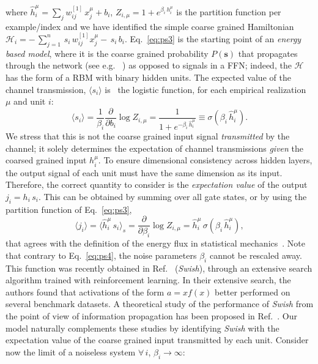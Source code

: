 \documentclass{article}
\begin{document}
%
where $\hat{h}^{\mu}_i = \sum_{j} w^{[1]}_{ij} \, x^{\mu}_j + b_i $,   $Z_{i, \mu}= 1+ e^{\beta_i \, h^{\mu}_i}$ is the partition function per example/index and we have identified the simple coarse grained Hamiltonian $\mathscr{H}_i = -  \, \sum_{j=1}^n \, s_i \, w^{[1]}_{ij} x^{\mu}_j -  \, s_i \, b_i$.
%
%
Eq.~\eqref{eq:ps3} is the starting point of an {\it energy based model}, where it is the coarse grained probability $P(\mathbf{s})$ that propagates through the network (see e.g.~\cite{connie} ) as opposed to signals in a FFN; indeed, the $\mathscr{H}$ has the form of a RBM with binary hidden units. The expected value of the channel transmission, $\langle s_i \rangle$ is~\cite{hertz} the logistic function, for each empirical realization $\mu$ and unit $i$:
%
\begin{equation} \label{eq:ps4}
\langle s_i \rangle = \frac{1}{\beta_i} \frac{\partial}{\partial b_i} \log Z_{i, \mu} =  \frac{1}{1+ e^{-\beta_i \, \hat{h}^{\mu}_i}} \equiv   \sigma(\beta_i \, \hat{h}^{\mu}_i).
\end{equation}
%
We stress that this is not the coarse grained input signal {\it transmitted} by the channel; it solely determines the expectation of channel transmissions {\it given} the coarsed grained input $h_i^{\mu}$. To ensure dimensional consistency across hidden layers, the output signal of each unit must have the same dimension as its input. Therefore, the correct quantity to consider is the {\it expectation value} of the output $j_i = h_i \, s_i $.  This can be  obtained by summing over all gate states, or by using the partition function of Eq.~\eqref{eq:ps3},
%
\begin{equation} \label{eq:ps5}
\langle j_i \rangle = \langle \hat{h}_i^{\mu} \, s_i \rangle_s = \frac{\partial}{\partial \beta_i} \log{Z_{i,\mu}} = \hat{h}^{\mu}_i \, \sigma(\beta_i \, \hat{h}^{\mu}_i),
\end{equation}
%
that agrees with the definition of the energy flux in statistical mechanics~\cite{bellac}. Note that contrary to Eq.~\eqref{eq:ps4}, the noise parameters $\beta_i$ cannot be rescaled away. This function was recently obtained in Ref.~\cite{prajit} ({\it Swish}), through an extensive search algorithm trained with reinforcement learning. In their extensive search, the authors found that activations of the form $a = x f(x)$  better performed on several benchmark datasets. A theoretical study of the performance of {\it Swish} from the point of view of information propagation has been proposed in Ref.~\cite{soufiane}.  Our model naturally complements these studies by identifying {\it Swish} with the expectation value of the coarse grained input transmitted by each unit. Consider now the limit of a noiseless system $\forall \, i$, $\beta_i \to \infty $:
\end{document}
